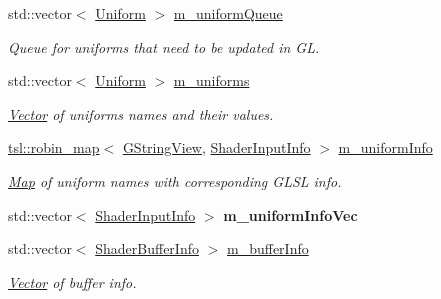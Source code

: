 \begin{DoxyCompactItemize}
std\+::vector$<$ \mbox{\hyperlink{structrev_1_1_uniform}{Uniform}} $>$ \mbox{\hyperlink{classrev_1_1_shader_program_a3a2ff90e8bb2a553d28329f425c58824}{m\+\_\+uniform\+Queue}}
\begin{DoxyCompactList}\small\item\em Queue for uniforms that need to be updated in GL. \end{DoxyCompactList}\item 
\mbox{\label{classrev_1_1_shader_program_a54877f3e0735020837f3d86e679f3634}} 
std\+::vector$<$ \mbox{\hyperlink{structrev_1_1_uniform}{Uniform}} $>$ \mbox{\hyperlink{classrev_1_1_shader_program_a54877f3e0735020837f3d86e679f3634}{m\+\_\+uniforms}}
\begin{DoxyCompactList}\small\item\em \mbox{\hyperlink{classrev_1_1_vector}{Vector}} of uniforms names and their values. \end{DoxyCompactList}\item 
\mbox{\label{classrev_1_1_shader_program_a2b9b163e17ced4e707f3579e4b6d1bc6}} 
\mbox{\hyperlink{classtsl_1_1robin__map}{tsl\+::robin\+\_\+map}}$<$ \mbox{\hyperlink{classrev_1_1_g_string_view}{G\+String\+View}}, \mbox{\hyperlink{structrev_1_1_shader_input_info}{Shader\+Input\+Info}} $>$ \mbox{\hyperlink{classrev_1_1_shader_program_a2b9b163e17ced4e707f3579e4b6d1bc6}{m\+\_\+uniform\+Info}}
\begin{DoxyCompactList}\small\item\em \mbox{\hyperlink{classrev_1_1_map}{Map}} of uniform names with corresponding G\+L\+SL info. \end{DoxyCompactList}\item 
\mbox{\label{classrev_1_1_shader_program_ad239001f261f877a82ffc2a1558758ac}} 
std\+::vector$<$ \mbox{\hyperlink{structrev_1_1_shader_input_info}{Shader\+Input\+Info}} $>$ {\bfseries m\+\_\+uniform\+Info\+Vec}
\item 
\mbox{\label{classrev_1_1_shader_program_a4ba4e15fe4284b7e4a5117c5721efa53}} 
std\+::vector$<$ \mbox{\hyperlink{structrev_1_1_shader_buffer_info}{Shader\+Buffer\+Info}} $>$ \mbox{\hyperlink{classrev_1_1_shader_program_a4ba4e15fe4284b7e4a5117c5721efa53}{m\+\_\+buffer\+Info}}
\begin{DoxyCompactList}\small\item\em \mbox{\hyperlink{classrev_1_1_vector}{Vector}} of buffer info. \end{DoxyCompactList}\item 

\end{DoxyCompactItemize}
